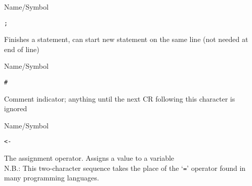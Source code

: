 \rl

\begin{desc}{Name/Symbol}

\item[Name/Symbol] \verb+;+ 

\item[Description]        Finishes a statement, can start new statement
                      on the same line (not needed at end of line)

\item[Usage]       

\item[Example]     

\item[See Also]

\end{desc}

\rl

\begin{desc}{Name/Symbol}     

\item[Name/Symbol] \verb!#!

\item[Description]   Comment indicator; anything until the next CR
	       following this character is ignored

\item[Usage]       

\item[Example]     

\item[See Also]

\end{desc} 


\rl
     
\begin{desc}{Name/Symbol}

\item[Name/Symbol] \verb!<-!                  

\item[Description]  The assignment operator.  Assigns a value to a variable\\
              N.B.: This two-character sequence takes the place of the
	      `\verb!=!' operator found in many programming languages.

\item[Usage]       

\item[Example]     

\item[See Also]  

\end{desc}   

